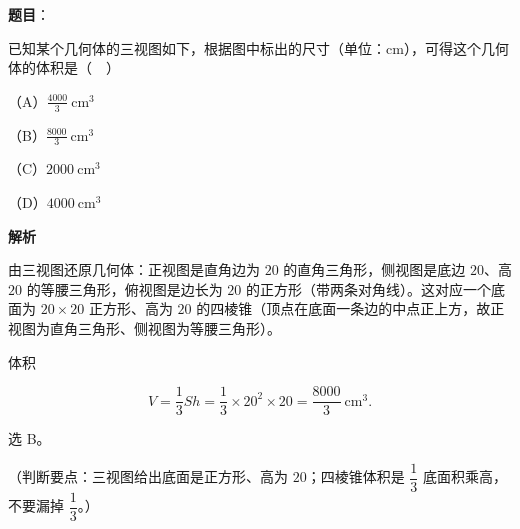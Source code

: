 \begin{answer}

\textbf{题目}：

已知某个几何体的三视图如下，根据图中标出的尺寸（单位：$\mathrm{cm}$），可得这个几何体的体积是（　）
\nopagebreak[4]
\begin{center}\end{center}
\nopagebreak[4]
（A）$\frac{4000}{3}\ \mathrm{cm^3}$

（B）$\frac{8000}{3}\ \mathrm{cm^3}$

（C）$2000\ \mathrm{cm^3}$

（D）$4000\ \mathrm{cm^3}$

\textbf{解析}

由三视图还原几何体：正视图是直角边为 $20$ 的直角三角形，侧视图是底边 $20$、高 $20$ 的等腰三角形，俯视图是边长为 $20$ 的正方形（带两条对角线）。这对应一个底面为 $20\times20$ 正方形、高为 $20$ 的四棱锥（顶点在底面一条边的中点正上方，故正视图为直角三角形、侧视图为等腰三角形）。

体积

\nopagebreak[4]
\[V=\frac13Sh=\frac13\times20^2\times20=\frac{8000}{3}\ \mathrm{cm^3}.\]

选 B。

（判断要点：三视图给出底面是正方形、高为 $20$；四棱锥体积是 $\dfrac13$ 底面积乘高，不要漏掉 $\dfrac13$。）


\end{answer}

